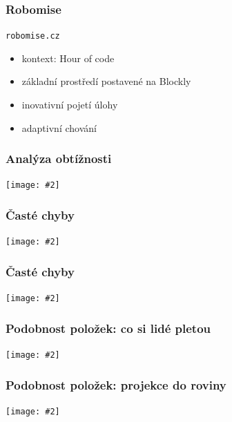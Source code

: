 \documentclass[bigger]{beamer}
\newcommand{\img}[2]{\begin{center}\texttt{[image: \#2]}\end{center}}
\begin{document}
\begin{frame}
  \frametitle{Robomise}

  \texttt{robomise.cz}

  \bigskip

  \begin{itemize}
  \item kontext: Hour of code
  \item základní prostředí postavené na Blockly
  \item inovativní pojetí úlohy
  \item adaptivní chování
  \end{itemize}
\end{frame}



\begin{frame}
  \frametitle{Analýza obtížnosti}

  \img{.5}{mult_dif}
\end{frame}

\begin{frame}
  \frametitle{Časté chyby}

  \img{.75}{mult_mistakes}
\end{frame}

\begin{frame}
  \frametitle{Časté chyby}

  \img{1}{analyza-carky}
\end{frame}

\begin{frame}
  \frametitle{Podobnost položek: co si lidé pletou}

  \img{.8}{confusion-clustering-map}
\end{frame}

\begin{frame}
  \frametitle{Podobnost položek: projekce do roviny}

  \img{1}{vyjmslovab}
\end{frame}
\end{document}
